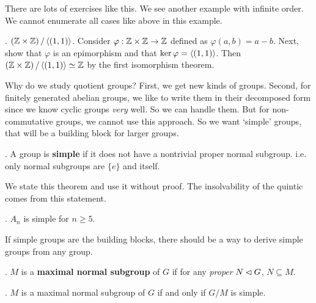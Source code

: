 There are lots of exercises like this. We see another example with infinite order. We cannot enumerate all cases like above in this example.

\ex. \((\mathbb{Z} \times \mathbb{Z}) \operatorname{/} \left\langle (1, 1) \right\rangle\). Consider \(\varphi : \mathbb{Z} \times \mathbb{Z} \rightarrow \mathbb{Z}\) defined as \(\varphi(a, b) = a - b\). Next, show that \(\varphi\) is an epimorphism and that \(\ker\varphi = \left\langle (1, 1) \right\rangle\). Then \((\mathbb{Z} \times \mathbb{Z}) \operatorname{/} \left\langle (1, 1) \right\rangle \simeq \mathbb{Z}\) by the first isomorphism theorem.

Why do we study quotient groups? First, we get new kinds of groups. Second, for finitely generated abelian groups, we like to write them in their decomposed form since we know cyclic groups \textit{very} well. So we can handle them. But for non-commutative groups, we cannot use this approach. So we want `simple' groups, that will be a building block for larger groups.

.  A group is \textbf{simple} if it does not have a nontrivial proper normal subgroup. i.e. only normal subgroups are \(\{e\}\) and itself.

We state this theorem and use it without proof. The insolvability of the quintic comes from this statement.

\thm. \(A_n\) is simple for \(n \geq 5\).

If simple groups are the building blocks, there should be a way to derive simple groups from any group.

.  \(M\) is a \textbf{maximal normal subgroup} of \(G\) if for any \textit{proper} \(N \lhd G\), \(N \subseteq M\).

\thm. \(M\) is a maximal normal subgroup of \(G\) if and only if \(G/M\) is simple.

\pagebreak
